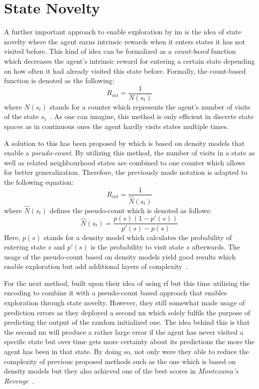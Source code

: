 \documentclass[draft,final]{vutinfth} %
\begin{document}
    \section{State Novelty}\label{sec:state-novelty}

    A further important approach to enable exploration by \gls{im} is the idea of state novelty where the agent earns intrinsic rewards when it enters states it has not visited before.
    This kind of idea can be formalized as a \textit{count-based} function which decreases the agent's intrinsic reward for entering a certain state depending on how often it had already visited this state before.
    Formally, the count-based function is denoted as the following:
    \begin{equation}
        R_{int}=\frac{1}{N(s_t)}
    \end{equation}
    where $N(s_t)$ stands for a counter which represents the agent's number of visits of the state $s_t$~\citep{aubret_survey_2019}.
    As one can imagine, this method is only efficient in discrete state spaces as in continuous ones the agent hardly visits states multiple times.

    A solution to this has been proposed by \citeauthor{bellemare_unifying_2016} which is based on density models that enable a \textit{pseudo-count}.
    By utilizing this method, the number of visits in a state as well as related neighbourhood states are combined to one counter which allows for better generalization.
    Therefore, the previously made notation is adapted to the following equation:
    \begin{equation}
        R_{int}=\frac{1}{\hat{N}(s_t)}
    \end{equation}
    where $\hat{N}(s_t)$ defines the pseudo-count which is denoted as follows:
    \begin{equation}
        \hat{N}(s_t)=\frac{p(s)(1-p'(s))}{p'(s)-p(s)}
    \end{equation}
    Here, $p(s)$ stands for a density model which calculates the probability of entering state $s$ and $p'(s)$ is the probability to visit state $s$ afterwards.
    The usage of the pseudo-count based on density models yield good results which enable exploration but add additional layers of complexity~\citep{aubret_survey_2019}.

    For the next method, \citeauthor{burda_exploration_2018} built upon their idea of using \gls{rf} but this time utilizing the encoding to combine it with a pseudo-count based approach that enables exploration through state novelty.
    However, they still somewhat made usage of prediction errors as they deployed a second \gls{nn} which solely fulfils the purpose of predicting the output of the random initialized one.
    The idea behind this is that the second \gls{nn} will produce a rather large error if the agent has never visited a specific state but over time gets more certainty about its predictions the more the agent has been in that state.
    By doing so, not only were they able to reduce the complexity of previous proposed methods such as the one which is based on density models but they also achieved one of the best scores in \textit{Montezuma's Revenge}~\citep{ecoffet_go-explore_2019}.
\end{document}
